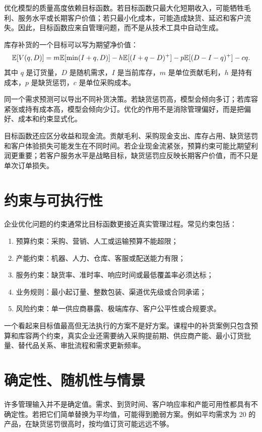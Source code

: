 \documentclass[UTF8,fontset=fandol,openany,zihao=-4]{ctexbook}
\begin{document}
优化模型的质量高度依赖目标函数。若目标函数只最大化短期收入，可能牺牲毛利、服务水平或长期客户价值；若只最小化成本，可能造成缺货、延迟和客户流失。因此，目标函数应来自管理问题，而不是从技术工具中自动生成。

库存补货的一个目标可以写为期望净价值：
\[
  \mathbb E[V(q,D)]
  =
  m\mathbb E[\min(I+q,D)]
  -
  h\mathbb E[(I+q-D)^+]
  -
  p\mathbb E[(D-I-q)^+]
  -
  cq.
\]
其中 \(q\) 是订货量，\(D\) 是随机需求，\(I\) 是当前库存，\(m\) 是单位贡献毛利，\(h\) 是持有成本，\(p\) 是缺货惩罚，\(c\) 是单位采购成本。

\begin{modernbox}[管理解释]
同一个需求预测可以导出不同补货决策。若缺货惩罚高，模型会倾向多订；若库容紧张或持有成本高，模型会倾向少订。优化的作用不是消除管理偏好，而是把偏好、成本和约束显式化。
\end{modernbox}

目标函数还应区分收益和现金流。贡献毛利、采购现金支出、库存占用、缺货惩罚和客户体验损失可能发生在不同时间。若企业现金流紧张，预算约束可能比期望利润更重要；若客户服务水平是战略目标，缺货惩罚应反映长期客户价值，而不只是单次订单损失。

\section{约束与可执行性}

企业优化问题的约束通常比目标函数更接近真实管理过程。常见约束包括：
\begin{enumerate}
  \item 预算约束：采购、营销、人工或运输预算不能超限；
  \item 产能约束：机器、人力、仓库、客服或配送能力有限；
  \item 服务约束：缺货率、准时率、响应时间或最低覆盖率必须达标；
  \item 业务规则：最小起订量、整数包装、渠道优先级或合同承诺；
  \item 风险约束：单一供应商暴露、极端库存、客户公平性或合规要求。
\end{enumerate}

一个看起来目标值最高但无法执行的方案不是好方案。课程中的补货案例只包含预算和库容两个约束，真实企业还需要纳入采购提前期、供应商产能、最小订货批量、替代品关系、审批流程和需求更新频率。

\section{确定性、随机性与情景}

许多管理输入并不是确定值。需求、到货时间、客户响应率和产能可用性都具有不确定性。若把它们简单替换为平均值，可能得到脆弱方案。例如平均需求为 20 的产品，在缺货惩罚很高时，按均值订货可能远远不够。
\end{document}
